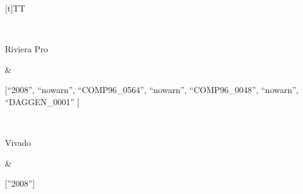 \documentclass[letterpaper,10pt,english]{sphinxmanual}
\begin{document}
\begin{savenotes}
\begin{tabulary}{\linewidth}[t]{TT}
\begin{varwidth}[t]{}
\sphinxbeforeendvarwidth
\end{varwidth}%
\\
\sphinxhline\begin{varwidth}[t]{}
\sphinxAtStartPar
Riviera Pro
\sphinxbeforeendvarwidth
\end{varwidth}%
&\begin{varwidth}[t]{}
\sphinxAtStartPar
{[}“\sphinxhyphen{}2008”, “\sphinxhyphen{}nowarn”, “COMP96\_0564”, “\sphinxhyphen{}nowarn”, “COMP96\_0048”, “\sphinxhyphen{}nowarn”, “DAGGEN\_0001”        {]}
\sphinxbeforeendvarwidth
\end{varwidth}%
\\
\sphinxhline\begin{varwidth}[t]{}
\sphinxAtStartPar
Vivado
\sphinxbeforeendvarwidth
\end{varwidth}%
&\begin{varwidth}[t]{}
\sphinxAtStartPar
{[}”\textendash{}2008”{]}
\sphinxbeforeendvarwidth
\end{varwidth}%
\\
\sphinxbottomrule
\end{tabulary}
\sphinxtableafterendhook\par
\sphinxattableend\end{savenotes}
\label{\detokenize{api:table2}}
\sphinxAtStartPar
{}
\end{document}
